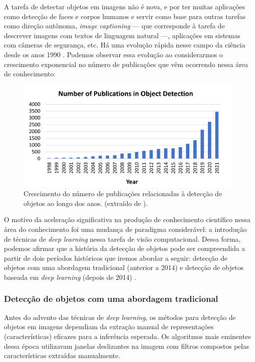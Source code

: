 A tarefa de detectar objetos em imagens não é nova, e por ter muitas aplicações como detecção de faces e corpos humanos e servir como base para outras tarefas como direção autônoma, \emph{image captioning} --- que corresponde à tarefa de descrever imagens com textos de linguagem natural ---, aplicações em sistemas com câmeras de segurança, etc. Há uma evolução rápida nesse campo da ciência desde os anos 1990 \citep{Zou2019Object, Zhao2018Object}. Podemos observar essa evolução ao considerarmos o crescimento exponencial no número de publicações que vêm ocorrendo nessa área de conhecimento:
\begin{figure}[htb!]
    \centering
    \includegraphics[width=0.8\linewidth]{images/obj_detection_evo.png}
    \caption{\label{fig:obj_evo}Crescimento do número de publicações relacionadas à detecção de objetos ao longo dos anos. (extraído de \citep{Zou2019Object}).}
\end{figure}

O motivo da aceleração significativa na produção de conhecimento científico nessa área do conhecimento foi uma mudança de paradigma considerável: a introdução de técnicas de \emph{deep learning} nessa tarefa de visão computacional. Dessa forma, podemos afirmar que a história da detecção de objetos pode ser compreendida a partir de dois períodos históricos que iremos abordar a seguir: detecção de objetos com uma abordagem tradicional (anterior a 2014) e detecção de objetos baseada em \emph{deep learning} (depois de 2014) \citep{Zou2019Object}.

\subsubsection{Detecção de objetos com uma abordagem tradicional}
Antes do advento das técnicas de \emph{deep learning}, os métodos para detecção de objetos em imagens dependiam da extração manual de representações (características) eficazes para a inferência esperada. Os algoritmos mais eminentes dessa época utilizavam janelas deslizantes na imagem com filtros compostos pelas características extraídas manualmente. 

